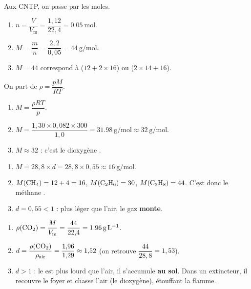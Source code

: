\documentclass[11pt,a4paper]{article}
\begin{document}
\begin{corrige}
Aux CNTP, on passe par les moles.
\begin{enumerate}[label=\alph*)]
  \item $n=\dfrac{V}{V_{\mathrm{m}}}=\dfrac{1{,}12}{22{,}4}=\qty{0.05}{\mole}$.
  \item $M=\dfrac{m}{n}=\dfrac{2{,}2}{0{,}05}=\qty{44}{\gram\per\mole}$.
  \item $M=44$ correspond à  ($12+2\times16$) ou  ($2\times14+16$).
\end{enumerate}
\end{corrige}

\begin{corrige}
On part de $\rho=\dfrac{pM}{RT}$.
\begin{enumerate}[label=\alph*)]
  \item $M=\dfrac{\rho RT}{p}$.
  \item $M=\dfrac{1{,}30\times0{,}082\times300}{1{,}0}=\qty{31.98}{\gram\per\mole}\approx\qty{32}{\gram\per\mole}$.
  \item $M\approx32$ : c'est le dioxygène .
\end{enumerate}
\end{corrige}

\begin{corrige}
\begin{enumerate}[label=\alph*)]
  \item $M=28{,}8\times d=28{,}8\times0{,}55\approx\qty{16}{\gram\per\mole}$.
  \item $M(\ce{CH4})=12+4=16$, $M(\ce{C2H6})=30$, $M(\ce{C3H8})=44$. C'est donc le méthane .
  \item $d=0{,}55<1$ : plus léger que l'air, le gaz \textbf{monte}.
\end{enumerate}
\end{corrige}

\begin{corrige}
\begin{enumerate}[label=\alph*)]
  \item $\rho(\ce{CO2})=\dfrac{M}{V_{\mathrm{m}}}=\dfrac{44}{22{,}4}=\qty{1.96}{\gram\per\litre}$.
  \item $d=\dfrac{\rho(\ce{CO2})}{\rho_{\text{air}}}=\dfrac{1{,}96}{1{,}29}\approx1{,}52$ (on retrouve
        $\dfrac{44}{28{,}8}=1{,}53$).
  \item $d>1$ : le  est plus lourd que l'air, il s'accumule \textbf{au sol}. Dans un
        extincteur, il recouvre le foyer et chasse l'air (le dioxygène), étouffant la flamme.
\end{enumerate}
\end{corrige}
\end{document}
